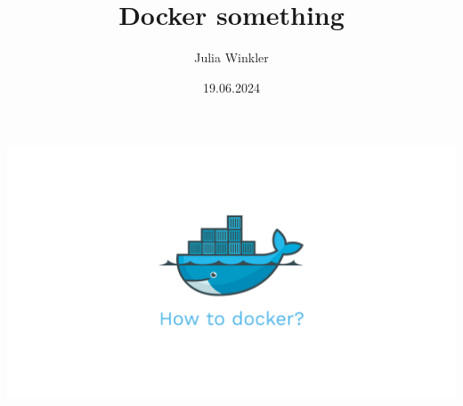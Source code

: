 \documentclass[22pt]{beamer}
\title{Docker something}
\author{Julia Winkler}
\date{19.06.2024}
\begin{document}

\begin{frame}[plain]
    \vfill
    \begin{center}
        \includegraphics[width=1\textwidth]{Bilder/docker-how.png}
    \end{center}
    \vfill
\end{frame}
\end{document}
